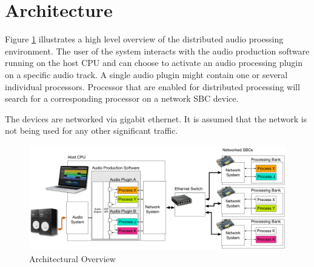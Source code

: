 \section{Architecture}

Figure \ref{fig:arch_01} illustrates a high level overview of the distributed audio proessing environment. The user of the system interacts with the audio production software running on the host CPU and can choose to activate an audio processing plugin on a specific audio track. A single audio plugin might contain one or several individual processors. Processor that are enabled for distributed processing will search for a corresponding processor on a network SBC device.

The devices are networked via gigabit ethernet. It is assumed that the network is not being used for any other significant traffic.

\begin{figure}[H]
    \centering
    \includegraphics[width=\textwidth]{assets/architecture_01.pdf}
    \caption{Architectural Overview}
    \label{fig:arch_01}
\end{figure}


